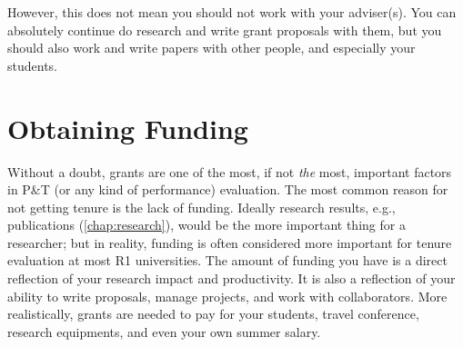 \documentclass[oneside,11pt,dvipsnames]{book}
\begin{document}
However, this does not mean you should not work with your adviser(s). You can absolutely continue do research and write grant proposals with them, but you should also work and write papers with other people, and especially your students.















\chapter{Obtaining Funding}\label{chap}
Without a doubt, grants are one of the most, if not \emph{the} most, important factors in P\&T (or any kind of performance) evaluation.  The most common reason for not getting tenure is the lack of funding. Ideally research results, e.g., publications (\autoref{chap:research}), would be the more important thing for a researcher; but in reality, funding is often considered more important for tenure evaluation at most R1 universities.
The amount of funding you have is a direct reflection of your research impact and productivity.  It is also a reflection of your ability to write proposals, manage projects, and work with collaborators. More realistically, grants are needed to pay for your students, travel conference, research equipments, and even your own summer salary.
\end{document}
